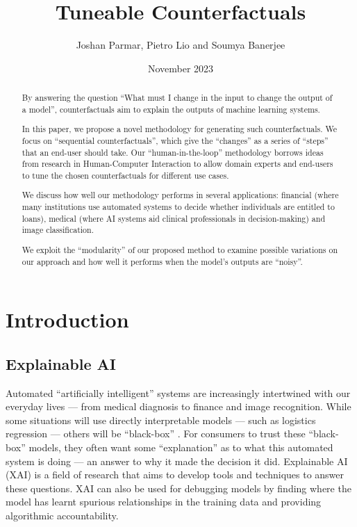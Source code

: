 \documentclass{article}
\title{Tuneable Counterfactuals}
\author{Joshan Parmar, Pietro Lio and Soumya Banerjee}
\date{November 2023}
\begin{document}
 
\maketitle

\begin{abstract}
    By answering the question ``What must I change in the input to change the output of a model'', counterfactuals aim to explain the outputs of machine learning systems. 

    In this paper, we propose a novel methodology for generating such counterfactuals. We focus on ``sequential counterfactuals'', which give the ``changes'' as a series of ``steps'' that an end-user should take. Our ``human-in-the-loop'' methodology borrows ideas from research in Human-Computer Interaction to allow domain experts and end-users to tune the chosen counterfactuals for different use cases. 
    
    We discuss how well our methodology performs in several applications: financial (where many institutions use automated systems to decide whether individuals are entitled to loans), medical (where AI systems aid clinical professionals in decision-making) and image classification. 
    
    We exploit the ``modularity'' of our proposed method to examine possible variations on our approach and how well it performs when the model's outputs are ``noisy''. 
    
\end{abstract}

\section{Introduction}
\subsection{Explainable AI}
Automated ``artificially intelligent'' systems are increasingly intertwined with our everyday lives --- from medical diagnosis to finance and image recognition. While some situations will use directly interpretable models --- such as logistics regression \citep{molnar_interpretable_2023}
--- others will be ``black-box'' \citep{castelvecchi_can_2016}. 
For consumers to trust these ``black-box'' models, they often want some ``explanation'' as to what this automated system is doing --- an answer to why it made the decision it did. Explainable AI (XAI) is a field of research that aims to develop tools and techniques to answer these questions. XAI can also be used for debugging models by finding where the model has learnt spurious relationships in the training data and providing algorithmic accountability.
\end{document}
